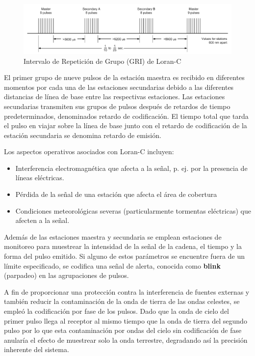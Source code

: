 \begin{figure}[!h]
  \centering
  \includegraphics[width=\linewidth]{06.radionavegacion/Imagenes/06.01.Loran/06_LoranC_pulsos_secuencia.png}
  \caption{Intervalo de Repetición de Grupo (GRI) de Loran-C \protect\cite{tooley2017aircraft}}
  \label{fig:06.LoranC.secuencia.pulsos}
\end{figure}

El primer grupo de nueve pulsos de la estación maestra es recibido en diferentes momentos por cada una de las estaciones secundarias debido a las diferentes distancias de línea de base entre las respectivas estaciones. Las estaciones secundarias transmiten sus grupos de pulsos después de retardos de tiempo predeterminados, denominados retardo de codificación. El tiempo total que tarda el pulso en viajar sobre la línea de base junto con el retardo de codificación de la estación secundaria se denomina retardo de emisión.

Los aspectos operativos asociados con Loran-C incluyen:
\begin{itemize}
\item Interferencia electromagnética que afecta a la señal, p. ej. por la presencia de líneas eléctricas.
\item Pérdida de la señal de  una estación que afecta el área
  de cobertura
\item Condiciones meteorológicas severas (particularmente tormentas eléctricas) que afecten a la señal.

\end{itemize}

Además de las estaciones maestra y secundaria se emplean  estaciones de monitoreo  para muestrear la intensidad de la señal de la cadena, el tiempo y la forma del pulso emitido.
Si alguno de estos parámetros se encuentre fuera de un límite especificado, se codifica una señal de alerta, conocida como {\bf blink} (parpadeo) en las agrupaciones de pulsos.



A fin de proporcionar una protección contra la interferencia de fuentes externas y también reducir la contaminación de la onda de tierra 
de las ondas celestes,
se empleó la codificaci\'on por fase de los pulsos. 
Dado que la onda de cielo del primer pulso llega al receptor al mismo tiempo que la onda de tierra del segundo pulso por lo que esta contaminación 
por ondas del cielo  sin codificación de fase anularía el efecto de muestrear solo la onda terrestre, degradando así la precisión inherente del sistema.

